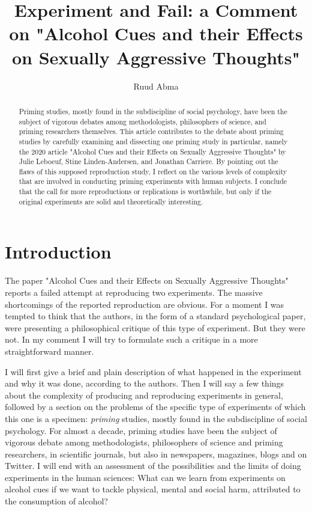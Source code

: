 \documentclass[twocolumn, serif, authordate, reflection]{jote-article}
\title{Experiment and Fail: a Comment on "Alcohol Cues and their Effects on Sexually Aggressive Thoughts"}
\author[1]{Ruud Abma}
\affil[1]{Descartes Centre for the History and Philosophy of the Sciences and the Humanities, Utrecht University, Utrecht, 3584 CH, the Netherlands}
\begin{document}
\setcounter{page}{20}
\begin{frontmatter}
\maketitle

\begin{abstract}
Priming studies, mostly found in the subdiscipline of social psychology, have been the subject of vigorous debates among methodologists, philosophers of science, and priming researchers themselves. This article contributes to the debate about priming studies by carefully examining and dissecting one priming study in particular, namely the 2020 article "Alcohol Cues and their Effects on Sexually Aggressive Thoughts" by Julie Leboeuf, Stine Linden-Andersen, and Jonathan Carriere. By pointing out the flaws of this supposed reproduction study, I reflect on the various levels of complexity that are involved in conducting priming experiments with human subjects. I conclude that the call for more reproductions or replications is worthwhile, but only if the original experiments are solid and theoretically interesting.
\end{abstract}
\end{frontmatter}

{}
\section*{Introduction}
The paper "Alcohol Cues and their Effects on Sexually Aggressive Thoughts" \parencite{Leboeuf2020} reports a failed attempt at reproducing two experiments. The massive shortcomings of the reported reproduction are obvious. For a moment I was tempted to think that the authors, in the form of a standard psychological paper, were presenting a philosophical critique of this type of experiment. But they were not. In my comment I will try to formulate such a critique in a more straightforward manner.
 
I will first give a brief and plain description of what happened in the experiment and why it was done, according to the authors. Then I will say a few things about the complexity of producing and reproducing experiments in general, followed by a section on the problems of the specific type of experiments of which this one is a specimen: \textit{priming} studies, mostly found in the subdiscipline of social psychology. For almost a decade, priming studies have been the subject of vigorous debate among methodologists, philosophers of science and priming researchers, in scientific journals, but also in newspapers, magazines, blogs and on Twitter. I will end with an assessment of the possibilities and the limits of doing experiments in the human sciences: What can we learn from experiments on alcohol cues if we want to tackle physical, mental and social harm, attributed to the consumption of alcohol?
\end{document}
